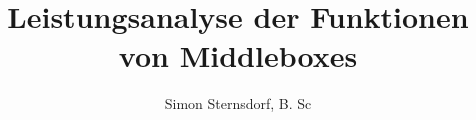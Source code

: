 \usepackage[utf8]{inputenc}
\usepackage{packages}
\usepackage{beamermods}

\author[S. Sternsdorf]{Simon Sternsdorf, B. Sc}
\title[Leistungsanalyse Middleboxes]{Leistungsanalyse der Funktionen von Middleboxes}




\usepackage{pgfpages}
\usepackage{ifthen}
\newif\ifsolution%
